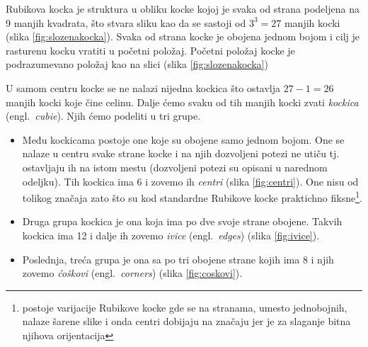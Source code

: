 \documentclass[a4paper]{article}
\begin{document}
Rubikova kocka je struktura u obliku kocke kojoj je svaka od strana podeljena na 9 manjih kvadrata, što stvara sliku kao da se sastoji od $3^3 = 27$ manjih kocki (slika \ref{fig:slozenakocka}).
Svaka od strana kocke je obojena jednom bojom i cilj je rasturenu kocku vratiti u početni položaj. Početni položaj kocke je podrazumevano položaj kao na slici (slika \ref{fig:slozenakocka})

U samom centru kocke se ne nalazi nijedna kockica što ostavlja $27 - 1 = 26$ manjih kocki koje čine celinu. Dalje ćemo svaku od tih manjih kocki zvati \textit{kockica} (engl.~{\em cubie}).
Njih ćemo podeliti u tri grupe.    
    
    \begin{figure}[h]
        \centering
        \caption{}
        \label{fig:kockice}
    \end{figure}
    
\begin{itemize}
\item Među kockicama postoje one koje su obojene samo jednom bojom.
    One se nalaze u centru svake strane kocke i na njih dozvoljeni potezi ne utiču tj. ostavljaju ih na istom mestu (dozvoljeni potezi su opisani u narednom odeljku).
    Tih kockica ima 6 i zovemo ih \textit{centri} (slika \ref{fig:centri}). One nisu od tolikog značaja zato što su kod standardne Rubikove kocke praktichno fiksne\footnote{postoje varijacije Rubikove kocke gde se na stranama, umesto jednobojnih, nalaze šarene slike i onda centri dobijaju na značaju jer je za slaganje bitna njihova orijentacija}.
\item Druga grupa kockica je ona koja ima po dve svoje strane obojene.
    Takvih kockica ima 12 i dalje ih zovemo \textit{ivice} (engl.~{\em edges}) (slika \ref{fig:ivice}).
\item Poslednja, treća grupa je ona sa po tri obojene strane kojih ima 8 i njih zovemo \textit{ćoškovi} (engl.~{\em corners}) (slika \ref{fig:coskovi}).
\end{itemize} 
\end{document}
